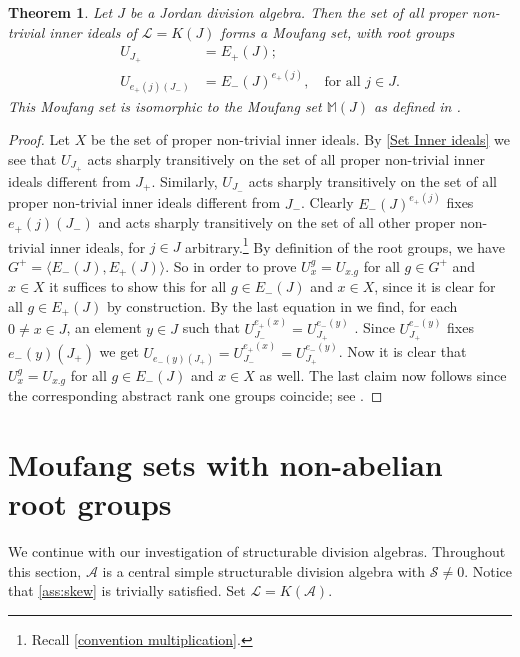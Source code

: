 \documentclass[oneside,a4paper]{amsart} %
\newtheorem{theorem}{Theorem}[section]
\theoremstyle{definition}
\newcommand{\A}{\mathcal{A}}
\renewcommand{\SS}{\mathcal{S}}
\newcommand{\LL}{\mathcal{L}}
\numberwithin{equation}{section}
\begin{document}
\begin{theorem}
\label{Set Inner are Moufang}
	Let $J$ be a Jordan division algebra. Then the set of all proper non-trivial inner ideals of $\LL=K(J)$ forms a Moufang set, with root groups 
	\begin{align*} 
		U_{J_+}&=E_+(J); \\
		U_{e_+(j)(J_-)}&=E_-(J)^{e_+(j)}, \quad \text{for all } j\in J .
	\end{align*}
	This Moufang set is isomorphic to the Moufang set $\mathbb{M}(J)$ as defined in \cite[\S 4]{DeMedts2006}.
\end{theorem}
\begin{proof}
	Let $X$ be the set of proper non-trivial inner ideals.
	By \cref{Set Inner ideals} we see that $U_{J_+}$ acts sharply transitively on the set of all proper non-trivial inner ideals different from $J_+$.
	Similarly, $U_{J_-}$ acts sharply transitively on the set of all proper non-trivial inner ideals different from $J_-$. 
	Clearly $E_-(J)^{e_+(j)}$ fixes $e_+(j)(J_-)$ and acts sharply transitively on the set of all other proper non-trivial inner ideals, for $j\in J$ arbitrary.\footnote{Recall \cref{convention multiplication}.}
	By definition of the root groups, we have $G^+=\langle E_-(J),E_+(J)\rangle$.
	So in order to prove $U_x^g=U_{x.g}$ for all $g\in G^+$ and $x\in X$ it suffices to show this for all $g\in E_-(J)$ and $x\in X$, since it is clear for all $g\in E_+(J)$ by construction.
	By the last equation in \cite[Theorem 5.1.1]{Boelaert2019} we find, for each $0\neq x\in J$, an element $y\in J$ such that $U_{J_-}^{e_+(x)}=U_{J_+}^{e_-(y)}$ .
	Since $U_{J_+}^{e_-(y)}$ fixes $e_-(y)(J_+)$ we get $U_{e_-(y)(J_+)}=U_{J_-}^{e_+(x)}=U_{J_+}^{e_-(y)}$.
	Now it is clear that $U_x^g=U_{x.g}$ for all $g\in E_-(J)$ and $x\in X$ as well.
	The last claim now follows since the corresponding abstract rank one groups coincide; see \cite[Lemma 1.1.12 and \S 5.1]{Boelaert2019}.
\end{proof}


\section{Moufang sets with non-abelian root groups}
\label{sec 5}

We continue with our investigation of structurable division algebras.
Throughout this section, $\A$ is a central simple structurable division algebra with $\SS\neq 0$.
Notice that \cref{ass:skew} is trivially satisfied.
Set $\LL=K(\A)$.
\end{document}
